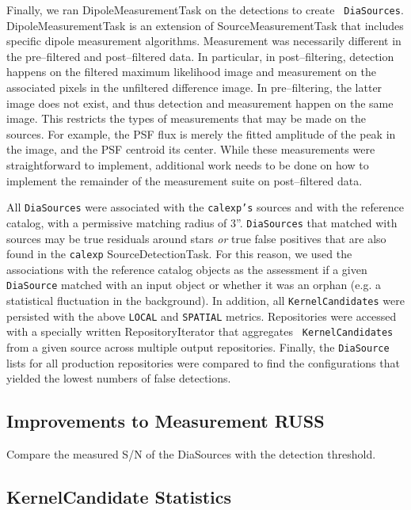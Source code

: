 \documentclass[prd, nofootinbib, floatfix, 11pt,tightenlines,times]{article}
\begin{document}
Finally, we ran DipoleMeasurementTask on the detections to create {\tt
  DiaSources}.  DipoleMeasurementTask is an extension of
SourceMeasurementTask that includes specific dipole measurement
algorithms.  Measurement was necessarily different in the
pre--filtered and post--filtered data.  In particular, in
post--filtering, detection happens on the filtered maximum likelihood
image and measurement on the associated pixels in the unfiltered
difference image.  In pre--filtering, the latter image does not exist,
and thus detection and measurement happen on the same image.  This
restricts the types of measurements that may be made on the sources.
For example, the PSF flux is merely the fitted amplitude of the peak
in the image, and the PSF centroid its center.  While these
measurements were straightforward to implement, additional work needs
to be done on how to implement the remainder of the measurement suite
on post--filtered data.

All {\tt DiaSources} were associated with the {\tt calexp's} sources
and with the reference catalog, with a permissive matching radius of
3''.  {\tt DiaSources} that matched with sources may be true residuals
around stars {\it or} true false positives that are also found in the
{\tt calexp} SourceDetectionTask.  For this reason, we used the
associations with the reference catalog objects as the assessment if a
given {\tt DiaSource} matched with an input object or whether it was
an orphan (e.g. a statistical fluctuation in the background).  In
addition, all {\tt KernelCandidates} were persisted with the above
{\tt LOCAL} and {\tt SPATIAL} metrics.  Repositories were accessed
with a specially written RepositoryIterator that aggregates {\tt
  KernelCandidates} from a given source across multiple output
repositories.  Finally, the {\tt DiaSource} lists for all production
repositories were compared to find the configurations that yielded the
lowest numbers of false detections.

\subsection{Improvements to Measurement {\bf RUSS}}

Compare the measured S/N of the DiaSources with the detection threshold.

\subsection{KernelCandidate Statistics \label{sec-stats}}
\end{document}
